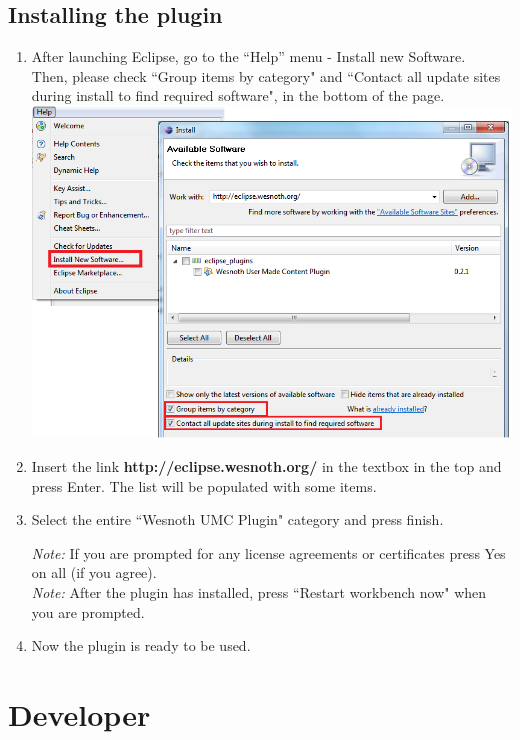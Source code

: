 \documentclass[10pt]{article}
\begin{document}
\subsection{Installing the plugin}
\begin{enumerate}
\item After launching Eclipse, go to the ``Help'' menu - Install new Software.\\
  Then, please check ``Group items by category" and ``Contact all update sites during install to find required software", in the bottom of the page.\\ \includegraphics[width=550px]{install_new_software.png}
\item Insert the link \textbf{http://eclipse.wesnoth.org/} in the textbox in the top and press Enter. The list will be populated with some items.
\item Select the entire ``Wesnoth UMC Plugin" category and press finish.

\textit{Note:} If you are prompted for any license agreements or certificates press Yes on all (if you agree).\\
\textit{Note:} After the plugin has installed, press ``Restart workbench now" when you are prompted.
\item Now the plugin is ready to be used.
\end{enumerate}

\section{Developer}
\end{document}
